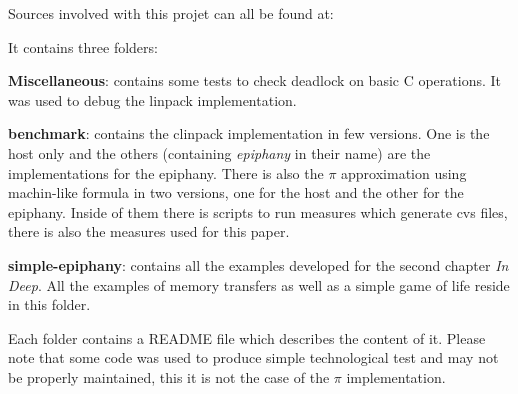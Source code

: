 Sources involved with this projet can all be found at: 

\begin{center}
\end{center}

It contains three folders:

\textbf{Miscellaneous}: contains some tests to check deadlock on basic C operations. It was used to debug the linpack implementation.

\textbf{benchmark}: contains the clinpack implementation in few versions. One is the host only and the others (containing \textit{\gls{epiphany}} in their name) are the implementations for the \gls{epiphany}. There is also the $\pi$ approximation using machin-like formula in two versions, one for the host and the other for the \gls{epiphany}. Inside of them there is scripts to run measures which generate cvs files, there is also the measures used for this paper.

\textbf{simple-epiphany}: contains all the examples developed for the second chapter \textit{In Deep}. All the examples of memory transfers as well as a simple game of life reside in this folder.

Each folder contains a README file which describes the content of it. Please note that some code was used to produce simple technological test and may not be properly maintained, this it is not the case of the $\pi$ implementation.